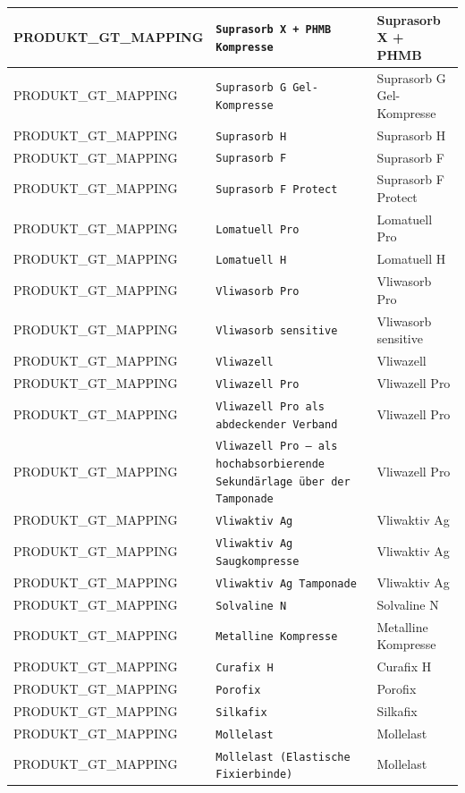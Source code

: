 \begin{longtable}{|p{3.5cm}|p{5cm}|p{6.5cm}|}
PRODUKT\_GT\_MAPPING & \texttt{Suprasorb X + PHMB Kompresse} & Suprasorb X + PHMB \\ \hline
PRODUKT\_GT\_MAPPING & \texttt{Suprasorb G Gel-Kompresse} & Suprasorb G Gel-Kompresse \\ \hline
PRODUKT\_GT\_MAPPING & \texttt{Suprasorb H} & Suprasorb H \\ \hline
PRODUKT\_GT\_MAPPING & \texttt{Suprasorb F} & Suprasorb F \\ \hline
PRODUKT\_GT\_MAPPING & \texttt{Suprasorb F Protect} & Suprasorb F Protect \\ \hline
PRODUKT\_GT\_MAPPING & \texttt{Lomatuell Pro} & Lomatuell Pro \\ \hline
PRODUKT\_GT\_MAPPING & \texttt{Lomatuell H} & Lomatuell H \\ \hline
PRODUKT\_GT\_MAPPING & \texttt{Vliwasorb Pro} & Vliwasorb Pro \\ \hline
PRODUKT\_GT\_MAPPING & \texttt{Vliwasorb sensitive} & Vliwasorb sensitive \\ \hline
PRODUKT\_GT\_MAPPING & \texttt{Vliwazell} & Vliwazell \\ \hline
PRODUKT\_GT\_MAPPING & \texttt{Vliwazell Pro} & Vliwazell Pro \\ \hline
PRODUKT\_GT\_MAPPING & \texttt{Vliwazell Pro als abdeckender Verband} & Vliwazell Pro \\ \hline
PRODUKT\_GT\_MAPPING & \texttt{Vliwazell Pro – als hochabsorbierende Sekundärlage über der Tamponade} & Vliwazell Pro \\ \hline
PRODUKT\_GT\_MAPPING & \texttt{Vliwaktiv Ag} & Vliwaktiv Ag \\ \hline
PRODUKT\_GT\_MAPPING & \texttt{Vliwaktiv Ag Saugkompresse} & Vliwaktiv Ag \\ \hline
PRODUKT\_GT\_MAPPING & \texttt{Vliwaktiv Ag Tamponade} & Vliwaktiv Ag \\ \hline
PRODUKT\_GT\_MAPPING & \texttt{Solvaline N} & Solvaline N \\ \hline
PRODUKT\_GT\_MAPPING & \texttt{Metalline Kompresse} & Metalline Kompresse \\ \hline
PRODUKT\_GT\_MAPPING & \texttt{Curafix H} & Curafix H \\ \hline
PRODUKT\_GT\_MAPPING & \texttt{Porofix} & Porofix \\ \hline
PRODUKT\_GT\_MAPPING & \texttt{Silkafix} & Silkafix \\ \hline
PRODUKT\_GT\_MAPPING & \texttt{Mollelast} & Mollelast \\ \hline
PRODUKT\_GT\_MAPPING & \texttt{Mollelast (Elastische Fixierbinde)} & Mollelast \\ \hline

\end{longtable}
